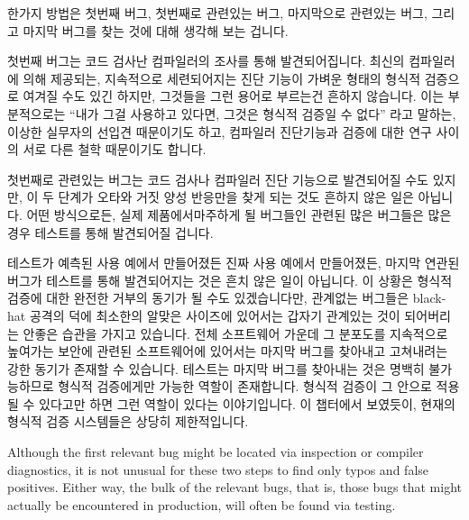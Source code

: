 한가지 방법은 첫번째 버그, 첫번째로 관련있는 버그, 마지막으로 관련있는 버그,
그리고 마지막 버그를 찾는 것에 대해 생각해 보는 겁니다.

첫번째 버그는 코드 검사난 컴파일러의 조사를 통해 발견되어집니다.
최신의 컴파일러에 의해 제공되는, 지속적으로 세련되어지는 진단 기능이 가벼운
형태의 형식적 검증으로 여겨질 수도 있긴 하지만, 그것들을 그런 용어로 부르는건
흔하지 않습니다.
이는 부분적으로는 ``내가 그걸 사용하고 있다면, 그것은 형식적 검증일 수 없다''
라고 말하는, 이상한 실무자의 선입견 때문이기도 하고, 컴파일러 진단기능과 검증에
대한 연구 사이의 서로 다른 철학 때문이기도 합니다.
\iffalse

One approach is to think in terms of finding the first bug, the first
relevant bug, the last relevant bug, and the last bug.

The first bug is normally found via inspection or compiler diagnostics.
Although the increasingly sophisticated diagnostics provided by modern
compilers might be considered to be a lightweight sort of formal
verification, it is not common to think of them in those terms.
This is in part due to an odd practitioner prejudice which says
``If I am using it, it cannot be formal verification'' on the one
hand, and the large difference in sophistication between compiler
diagnostics and verification research on the other.
\fi

첫번째로 관련있는 버그는 코드 검사나 컴파일러 진단 기능으로 발견되어질 수도
있지만, 이 두 단계가 오타와 거짓 양성 반응만을 찾게 되는 것도 흔하지 않은 일은
아닙니다.
어떤 방식으로든, 실제 제품에서마주하게 될 버그들인 관련된 많은 버그들은 많은
경우 테스트를 통해 발견되어질 겁니다.

테스트가 예측된 사용 예에서 만들어졌든 진짜 사용 예에서 만들어졌든, 마지막
연관된 버그가 테스트를 통해 발견되어지는 것은 흔치 않은 일이 아닙니다.
이 상황은 형식적 검증에 대한 완전한 거부의 동기가 될 수도 있겠습니다만,
관계없는 버그들은 black-hat 공격의 덕에 최소한의 알맞은 사이즈에 있어서는
갑자기 관계있는 것이 되어버리는 안좋은 습관을 가지고 있습니다.
전체 소프트웨어 가운데 그 분포도를 지속적으로 높여가는 보안에 관련된
소프트웨어에 있어서는 마지막 버그를 찾아내고 고쳐내려는 강한 동기가 존재할 수
있습니다.
테스트는 마지막 버그를 찾아내는 것은 명백히 불가능하므로 형식적 검증에게만
가능한 역할이 존재합니다.
형식적 검증이 그 안으로 적용될 수 있다고만 하면 그런 역할이 있다는
이야기입니다.
이 챕터에서 보였듯이, 현재의 형식적 검증 시스템들은 상당히 제한적입니다.
\iffalse

Although the first relevant bug might be located via inspection or
compiler diagnostics, it is not unusual for these two steps to find
only typos and false positives.
Either way, the bulk of the relevant bugs, that is, those bugs that
might actually be encountered in production, will often be found via testing.

